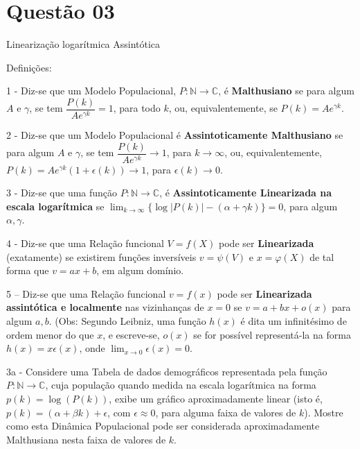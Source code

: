 


\section*{Questão 03}


Linearização logarítmica  Assintótica

Definições:

    1 - Diz-se que um Modelo Populacional, \(P: \mathbb{N} \to \mathbb{C}\), é \textbf{Malthusiano} se para algum \(A\) e \(\gamma\), se tem \(\dfrac{P(k)}{Ae^{\gamma k}} = 1\), para todo \(k\), ou, equivalentemente, se \(P(k) = Ae^{\gamma k}\).

    2 - Diz-se que um Modelo Populacional é \textbf{Assintoticamente Malthusiano} se para algum \(A\) e \(\gamma\), se tem \(\dfrac{P(k)}{Ae^{\gamma k}} \to 1\), para \(k \to \infty\), ou, equivalentemente, \(P(k) = Ae^{\gamma k} (1+\epsilon(k)) \to 1\), para \(\epsilon(k) \to 0\).

    3 - Diz-se que uma função \(P: \mathbb{N} \to \mathbb{C}\), é \textbf{Assintoticamente Linearizada na escala logarítmica} se
    \(\displaystyle \lim_{k \to \infty} \{\log|P(k)| - (\alpha +\gamma k)\} = 0\), para algum \(\alpha, \gamma\).

    4 - Diz-se que uma Relação funcional \(V = f(X)\) pode ser \textbf{Linearizada} (exatamente) se existirem funções inversíveis \(v = \psi(V)\) e \(x = \varphi(X)\) de tal forma que \(v = ax + b\), em algum domínio.

    5 – Diz-se que uma Relação funcional \(v = f(x)\) pode ser \textbf{Linearizada assintótica e localmente} nas vizinhanças de \(x = 0\) se \(v = a + bx + o(x)\) para algum \(a, b\). (Obs: Segundo Leibniz, uma função \(h(x)\) é dita um infinitésimo de ordem menor do que \(x\), e escreve-se, \(o(x)\) se for possível representá-la na forma \(h(x) = x \epsilon(x)\), onde \(\displaystyle \lim_{x \to 0} \epsilon(x) = 0\).

    3a - Considere uma Tabela de dados demográficos representada pela função \(P: \mathbb{N} \to \mathbb{C}\), cuja população quando medida na escala logarítmica na forma \(p(k) = \log(P(k))\), exibe um gráfico aproximadamente linear (isto é, \(p(k) = (\alpha + \beta k) + \epsilon\), com \(\epsilon \approx 0\), para alguma faixa de valores de \(k\)). Mostre como esta Dinâmica Populacional pode ser considerada aproximadamente Malthusiana nesta faixa de valores de \(k\).

